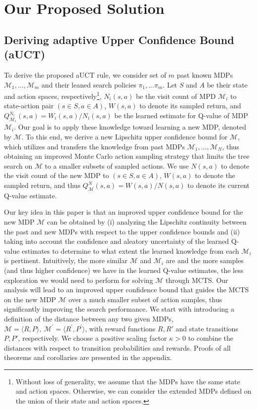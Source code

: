 \section{Our Proposed Solution}

\subsection{Deriving adaptive Upper Confidence Bound (aUCT)}

To derive the proposed aUCT rule, we consider set of $m$ past known MDPs $\mathcal{M}_1,\ldots,\mathcal{M}_m$ and their leaned search policies $\pi_1,\ldots\pi_m$. Let $S$ and $A$ be their state and action spaces, respectively\footnote{Without loss of generality, we assume that the MDPs have the same state and action spaces. Otherwise, we can consider the extended MDPs defined on the union of their state and action spaces.}, $N_i(s,a)$ be the visit count of MPD $\mathcal{M}_i$ to state-action pair $(s\in S,a\in A)$, $W(s,a)$ to denote its sampled return, and $Q^{N_i}_{\mathcal{M}_i}(s,a)=W_i(s,a)/N_i(s,a)$ be the learned estimate for Q-value of MDP $\mathcal{M}_i$. Our goal is to apply these knowledge toward learning a new MDP, denoted by $\mathcal{M}$. To this end, we derive a new Lipschitz upper confidence bound for $\mathcal{M}$, which utilizes and transfers the knowledge from past MDPs $\mathcal{M}_1,\ldots,\mathcal{M}_N$, thus obtaining an improved Monte Carlo action sampling strategy that limits the tree search on $\mathcal{M}$ to a smaller subsets of sampled actions. We use $N(s,a)$ to denote the visit count of the new MDP to $(s\in S,a\in A)$, $W(s,a)$ to denote the sampled return, and thus $Q^N_{\mathcal{M}}(s,a)=W(s,a)/N(s,a)$ to denote its current Q-value estimate. 

Our key idea in this paper is that an improved upper confidence bound for the new MDP $\mathcal{M}$ can be obtained by (i) analyzing the Lipschitz
continuity between the past and new MDPs with respect to the upper confidence bounds and (ii) taking into account the confidence and aleatory uncertainty of the learned Q-value estimates to determine to what extent the learned knowledge from each $\mathcal{M}_i$ is pertinent. Intuitively, the more similar $\mathcal{M}$ and $\mathcal{M}_i$ are and the more samples (and thus higher confidence) we have in the learned Q-value estimates, the less exploration we would need to perform for solving $\mathcal{M}$ through MCTS. Our analysis will lead to an improved upper confidence bound that guides the MCTS on the new MDP $\mathcal{M}$ over a much smaller subset of action samples, thus significantly improving the search performance. We start with introducing a definition of the distance between any two given MDPs, $\mathcal{M}=\langle R,P\rangle, \ {\mathcal{M}}^{\prime} = \langle {R}^{\prime},{P}^{\prime}\rangle$, with reward functions $R,R'$ and state transitions $P,P'$, respectively. We choose a positive scaling factor $\kappa>0$ to combine the distances with respect to transition probabilities and rewards. Proofs of all theorems and corollaries are presented in the appendix.


